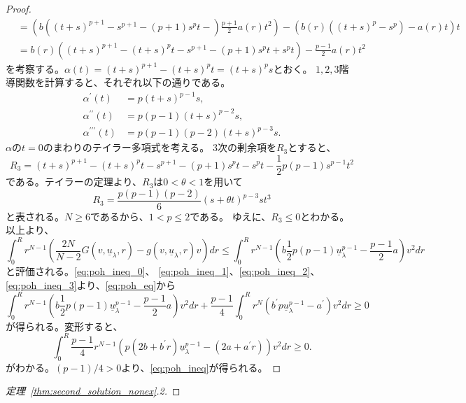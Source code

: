 \begin{proof}
\begin{align*}
  &= \left( b \left( (t+s)^{p+1} - s^{p+1} - (p+1)s^p t - \right)
  \frac{p+1}{2} a(r) t^2 \right) - \left( b(r) \left( (t+s)^p - s^p
  \right) - a(r) t \right) t \\
  &= b(r) \left( (t+s)^{p+1} - (t+s)^p t - s^{p+1} - (p+1)s^p t + s^p
  t \right) -\frac{p-1}{2} a(r) t^2
 \end{align*}
 を考察する。$\alpha(t) = (t+s)^{p+1} - (t+s)^p t = (t+s)^p s$とおく。
 $1, 2, 3$階導関数を計算すると、それぞれ以下の通りである。
 \begin{align*}
  \alpha^\prime(t) &= p(t+s)^{p-1}s, \\
  \alpha^{\prime\prime}(t) &= p(p-1)(t+s)^{p-2}s, \\
  \alpha^{\prime\prime\prime}(t) &= p(p-1)(p-2)(t+s)^{p-3}s.
 \end{align*}
 $\alpha$の$t = 0$のまわりのテイラー多項式を考える。
 $3$次の剰余項を$R_3$とすると、
 \[
  R_3 = (t+s)^{p+1} - (t+s)^p t -s^{p+1} -(p+1)s^p t - s^p t -
 \frac{1}{2}p(p-1) s^{p-1}t^2
 \]
 である。テイラーの定理より、$R_3$は$0 < \theta < 1$を用いて
 \[
  R_3 = \frac{p(p-1)(p-2)}{6}(s + \theta t)^{p-3} st^3
 \]
 と表される。$N \geq 6$であるから、$1 < p \leq 2$である。
 ゆえに、$R_3 \leq 0$とわかる。以上より、
 \begin{equation}
  \int_0^R r^{N-1} \left( \frac{2N}{N-2} G(v, \underline{u}_\lambda,
           r) - g(v, \underline{u}_\lambda, r) v \right) dr \leq \int_0^R
  r^{N-1} \left( b \frac{1}{2} p(p-1) \underline{u}_\lambda^{p-1} -
 \frac{p-1}{2} a  \right) v^2 dr \label{eq:poh_ineq_3}
 \end{equation}
 と評価される。\eqref{eq:poh_ineq_0}、
 \eqref{eq:poh_ineq_1}、\eqref{eq:poh_ineq_2}、
 \eqref{eq:poh_ineq_3}より、\eqref{eq:poh_eq}から
 \[
  \int_0^R r^{N-1} \left( b \frac{1}{2} p(p-1)
 \underline{u}_\lambda^{p-1} - \frac{p-1}{2} a \right) v^2 dr 
 + \frac{p-1}{4} \int_0^R r^N \left( b^\prime p
 \underline{u}_\lambda^{p-1} - a^\prime \right) v^2 dr \geq 0
 \]
 が得られる。変形すると、
 \[
  \int_0^R \frac{p-1}{4}  r^{N-1} \left( p(2b + b^\prime r)
 \underline{u}_\lambda^{p-1} 
 - (2a + a^\prime r) \right) v^2 dr \geq 0.
 \]
 がわかる。$(p-1)/4 > 0$より、\eqref{eq:poh_ineq}が得られる。\qedhere
\end{proof}

\begin{proof}[定理~\ref{thm:second_solution_nonex}.2]
 
\end{proof}


